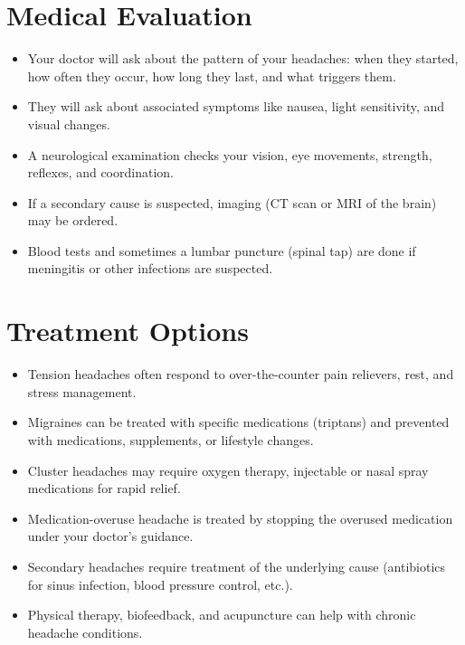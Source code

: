 \section*{Medical Evaluation}
\begin{itemize}
  \item Your doctor will ask about the pattern of your headaches: when they started, how often they occur, how long they last, and what triggers them.
  \item They will ask about associated symptoms like nausea, light sensitivity, and visual changes.
  \item A neurological examination checks your vision, eye movements, strength, reflexes, and coordination.
  \item If a secondary cause is suspected, imaging (CT scan or MRI of the brain) may be ordered.
  \item Blood tests and sometimes a lumbar puncture (spinal tap) are done if meningitis or other infections are suspected.
\end{itemize}

\section*{Treatment Options}
\begin{itemize}
  \item Tension headaches often respond to over-the-counter pain relievers, rest, and stress management.
  \item Migraines can be treated with specific medications (triptans) and prevented with medications, supplements, or lifestyle changes.
  \item Cluster headaches may require oxygen therapy, injectable or nasal spray medications for rapid relief.
  \item Medication-overuse headache is treated by stopping the overused medication under your doctor's guidance.
  \item Secondary headaches require treatment of the underlying cause (antibiotics for sinus infection, blood pressure control, etc.).
  \item Physical therapy, biofeedback, and acupuncture can help with chronic headache conditions.
\end{itemize}

